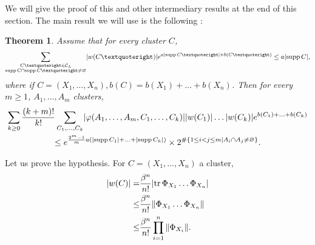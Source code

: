 \documentclass{article}
\DeclarePairedDelimiter\abs{\lvert}{\rvert}
\DeclarePairedDelimiter\norm{\lVert}{\rVert}
\newtheorem{thm}{Theorem}
\DeclareMathOperator{\tr}{tr}
\DeclareMathOperator{\supp}{supp}
\begin{document}
We will give the proof of this and other intermediary results at the end of this section.
The main result we will use is the following : 
\begin{thm}
    Assume that for every cluster $C$,$$
        \sum_{\substack{C’\in \mathcal C_\Lambda\\\supp C\cap \supp C’\neq\varnothing}}\abs{w(C’)}e^{a\abs{\supp C’}+b(C’)}\leq a\abs{\supp C},
    $$
    where if $C=(X_1,\ldots,X_n),b(C)=b(X_1)+\ldots+b(X_n)$.
    Then for every $m\geq 1$, $A_1,\ldots ,A_m$ clusters,
    \begin{multline*}
        \sum_{k\geq 0}\frac{(k+m)!}{k!}\sum_{C_1,\ldots,C_k}\abs{\varphi(A_1,\ldots,A_m,C_1,\ldots,C_k)}\abs{w(C_1)}\ldots \abs{w(C_k)}e^{b(C_1)+\ldots+b(C_k)}\\
            \leq e^{\frac{2^m-1}{m}a(\abs{\supp C_1}+\ldots+\abs{\supp C_k})}\times 2^{\#\{1\leq i<j\leq m\mid A_i\cap A_j\neq\varnothing\}}.
        \end{multline*}
\end{thm}
 Let us prove the hypothesis.
 For $C=(X_1,\ldots,X_n)$ a cluster,
 \begin{align*}
|w(C)|=&\frac{\beta^{n}}{n!}\abs{\tr\Phi_{X_1}\ldots\Phi_{X_n}}\\
\leq& \frac{\beta^{n}}{n!}\norm{\Phi_{X_1}\ldots\Phi_{X_n}}\\
\leq &\frac{\beta^{n}}{n!}\prod_{i=1}^n{\norm{\Phi_{X_i}}}.
 \end{align*}
 
 
 
\end{document}
